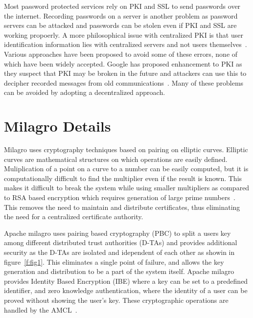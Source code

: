 Most password protected services rely on PKI and SSL to send passwords
over the internet. Recording passwords on a server is another problem
as password servers can be attacked and passwords can be stolen even
if PKI and SSL are working propoerly. A more philosophical issue with
centralized PKI is that user identification information lies with
centralized servers and not users
themselves~\cite{distlab-pki-problems}.  Various approaches have been
proposed to avoid some of these errors, none of which have been widely
accepted. Google has proposed enhancement to PKI as they suspect that
PKI may be broken in the future and attackers can use this to decipher
recorded messages from old
communications~\cite{securityweek-ssl-threats}.  Many of these
problems can be avoided by adopting a decentralized approach.


\section{Milagro Details}
Milagro uses cryptography techniques based on pairing on elliptic
curves. Elliptic curves are mathematical structures on which
operations are easily defined. Muliplication of a point on a curve to
a number can be easily computed, but it is computationally difficult
to find the multiplier even if the result is known. This makes it
difficult to break the system while using smaller multipliers as
compared to RSA based encryption which requires generation of large
prime numbers~\cite{milagro-concepts}. This removes the need to
maintain and distribute certificates, thus eliminating the need for a
centralized certificate authority.

Apache milagro uses pairing based cryptography (PBC) to split a users
key among different distributed trust authorities (D-TAs) and provides
additional security as the D-TAs are isolated and idependent of each
other as showin in figure~\ref{f:fig1}. This eliminates a single point
of failure, and allows the key generation and distribution to be a
part of the system itself. Apache milagro provides Identity Based
Encryption (IBE) where a key can be set to a predefined identifier,
and zero knowledge authentication, where the identity of a user can be
proved without showing the user's key.  These cryptographic operations
are handled by the AMCL~\cite{milagro-concepts}.

